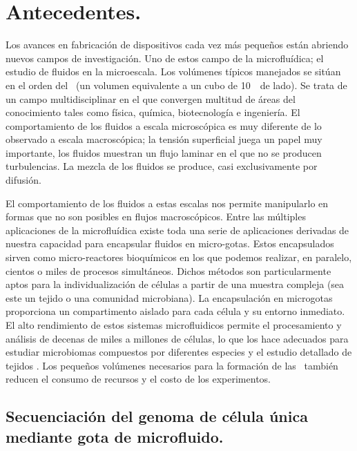 \section{Antecedentes.}\label{sec:1_antecedentes}
Los avances en fabricación de dispositivos cada vez más pequeños están abriendo nuevos campos de investigación. Uno de estos campo de la microfluídica; el estudio de fluidos en la microescala. Los volúmenes típicos manejados se sitúan en el orden del \picolitro\ (un volumen equivalente a un cubo de 10~\micrometro\ de lado). Se trata de un campo multidisciplinar en el que convergen multitud de áreas del conocimiento tales como física, química, biotecnología e ingeniería. El comportamiento de los fluidos a escala microscópica es muy diferente de lo observado a escala macroscópica; la tensión superficial juega un papel muy importante, los fluidos muestran un flujo laminar en el que no se producen turbulencias. La mezcla de los fluidos se produce, casi exclusivamente por difusión.

El comportamiento de los fluidos a estas escalas nos permite manipularlo en formas que no son posibles en flujos macroscópicos. Entre las múltiples aplicaciones de la microfluídica existe toda una serie de aplicaciones derivadas de nuestra capacidad para encapsular fluidos en micro-gotas. Estos encapsulados sirven como micro-reactores bioquímicos en los que podemos realizar, en paralelo, cientos o miles de procesos simultáneos. Dichos métodos son particularmente aptos para la individualización de células a partir de una muestra compleja (sea este un tejido o una comunidad microbiana). La encapsulación en microgotas proporciona un compartimento aislado para cada célula y su entorno inmediato. El alto rendimiento de estos sistemas microfluidicos permite el procesamiento y análisis de decenas de miles a millones de células, lo que los hace adecuados para estudiar microbiomas compuestos por diferentes especies y el estudio detallado de tejidos \citep{article:haakan}. Los pequeños volúmenes necesarios para la formación de las \gotas\ también reducen el consumo de recursos y el costo de los experimentos.


\subsection{Secuenciación del genoma de célula única mediante gota de microfluido.}\label{sec:antecedentes:secuenciacion}

